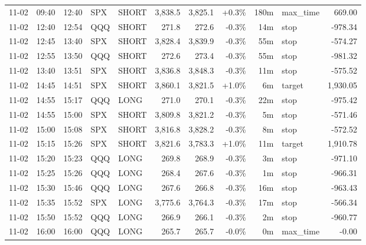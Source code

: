 \documentclass[11pt,a4paper,twoside]{article}
\begin{document}
\begin{center}
\begin{longtable}{>{\color{txtmain}}l l l l l r r r r >{\color{txtmain}}l r}
11-02 & 09:40 & 12:40 & SPX & SHORT & 3,838.5 & 3,825.1 & \textcolor{wingreen}{+0.3\%} & 180m & max\_time & \textcolor{wingreen}{669.00} \\
11-02 & 12:40 & 12:54 & QQQ & SHORT & 271.8 & 272.6 & \textcolor{lossred}{-0.3\%} & 14m & stop & \textcolor{lossred}{-978.34} \\
11-02 & 12:45 & 13:40 & SPX & SHORT & 3,828.4 & 3,839.9 & \textcolor{lossred}{-0.3\%} & 55m & stop & \textcolor{lossred}{-574.27} \\
11-02 & 12:55 & 13:50 & QQQ & SHORT & 272.6 & 273.4 & \textcolor{lossred}{-0.3\%} & 55m & stop & \textcolor{lossred}{-981.32} \\
11-02 & 13:40 & 13:51 & SPX & SHORT & 3,836.8 & 3,848.3 & \textcolor{lossred}{-0.3\%} & 11m & stop & \textcolor{lossred}{-575.52} \\
11-02 & 14:45 & 14:51 & SPX & SHORT & 3,860.1 & 3,821.5 & \textcolor{wingreen}{+1.0\%} & 6m & target & \textcolor{wingreen}{1,930.05} \\
11-02 & 14:55 & 15:17 & QQQ & LONG & 271.0 & 270.1 & \textcolor{lossred}{-0.3\%} & 22m & stop & \textcolor{lossred}{-975.42} \\
11-02 & 14:55 & 15:00 & SPX & SHORT & 3,809.8 & 3,821.2 & \textcolor{lossred}{-0.3\%} & 5m & stop & \textcolor{lossred}{-571.46} \\
11-02 & 15:00 & 15:08 & SPX & SHORT & 3,816.8 & 3,828.2 & \textcolor{lossred}{-0.3\%} & 8m & stop & \textcolor{lossred}{-572.52} \\
11-02 & 15:15 & 15:26 & SPX & SHORT & 3,821.6 & 3,783.3 & \textcolor{wingreen}{+1.0\%} & 11m & target & \textcolor{wingreen}{1,910.78} \\
11-02 & 15:20 & 15:23 & QQQ & LONG & 269.8 & 268.9 & \textcolor{lossred}{-0.3\%} & 3m & stop & \textcolor{lossred}{-971.10} \\
11-02 & 15:25 & 15:26 & QQQ & LONG & 268.4 & 267.6 & \textcolor{lossred}{-0.3\%} & 1m & stop & \textcolor{lossred}{-966.31} \\
11-02 & 15:30 & 15:46 & QQQ & LONG & 267.6 & 266.8 & \textcolor{lossred}{-0.3\%} & 16m & stop & \textcolor{lossred}{-963.43} \\
11-02 & 15:35 & 15:52 & SPX & LONG & 3,775.6 & 3,764.3 & \textcolor{lossred}{-0.3\%} & 17m & stop & \textcolor{lossred}{-566.34} \\
11-02 & 15:50 & 15:52 & QQQ & LONG & 266.9 & 266.1 & \textcolor{lossred}{-0.3\%} & 2m & stop & \textcolor{lossred}{-960.77} \\
11-02 & 16:00 & 16:00 & QQQ & LONG & 265.7 & 265.7 & \textcolor{lossred}{-0.0\%} & 0m & max\_time & \textcolor{lossred}{-0.00} \\

\end{longtable}
\end{center}
\end{document}

